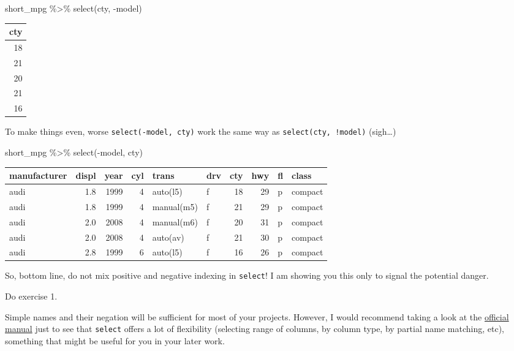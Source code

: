 \documentclass[
]{book}
\newenvironment{Shaded}{\begin{snugshade}}{\end{snugshade}}
\newcommand{\FunctionTok}[1]{\textcolor[rgb]{0.00,0.00,0.00}{#1}}
\newcommand{\NormalTok}[1]{#1}
\newcommand{\SpecialCharTok}[1]{\textcolor[rgb]{0.00,0.00,0.00}{#1}}
\begin{document}
\begin{Shaded}
\begin{Highlighting}[]
\NormalTok{short\_mpg }\SpecialCharTok{\%\textgreater{}\%}
  \FunctionTok{select}\NormalTok{(cty, }\SpecialCharTok{{-}}\NormalTok{model)}
\end{Highlighting}
\end{Shaded}

\begin{tabular}{r}
\hline
cty\\
\hline
18\\
\hline
21\\
\hline
20\\
\hline
21\\
\hline
16\\
\hline
\end{tabular}

To make things even, worse \texttt{select(-model,\ cty)} work the same way as \texttt{select(cty,\ !model)} (sigh\ldots)

\begin{Shaded}
\begin{Highlighting}[]
\NormalTok{short\_mpg }\SpecialCharTok{\%\textgreater{}\%}
  \FunctionTok{select}\NormalTok{(}\SpecialCharTok{{-}}\NormalTok{model, cty)}
\end{Highlighting}
\end{Shaded}

\begin{tabular}{l|r|r|r|l|l|r|r|l|l}
\hline
manufacturer & displ & year & cyl & trans & drv & cty & hwy & fl & class\\
\hline
audi & 1.8 & 1999 & 4 & auto(l5) & f & 18 & 29 & p & compact\\
\hline
audi & 1.8 & 1999 & 4 & manual(m5) & f & 21 & 29 & p & compact\\
\hline
audi & 2.0 & 2008 & 4 & manual(m6) & f & 20 & 31 & p & compact\\
\hline
audi & 2.0 & 2008 & 4 & auto(av) & f & 21 & 30 & p & compact\\
\hline
audi & 2.8 & 1999 & 6 & auto(l5) & f & 16 & 26 & p & compact\\
\hline
\end{tabular}

So, bottom line, do not mix positive and negative indexing in \texttt{select}! I am showing you this only to signal the potential danger.

Do exercise 1.

Simple names and their negation will be sufficient for most of your projects. However, I would recommend taking a look at the \href{https://dplyr.tidyverse.org/reference/select.html}{official manual} just to see that \texttt{select} offers a lot of flexibility (selecting range of columns, by column type, by partial name matching, etc), something that might be useful for you in your later work.
\end{document}
